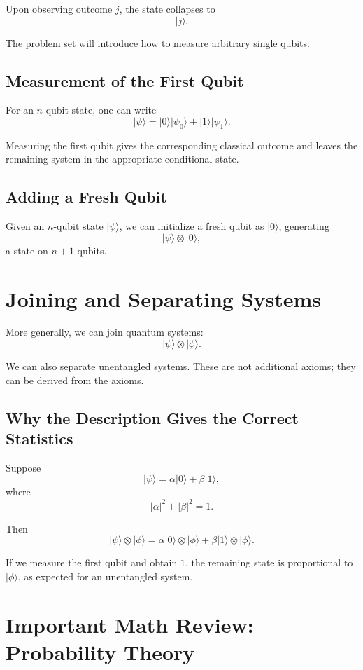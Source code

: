 \documentclass[11pt]{article}
\newcommand{\ket}[1]{\lvert #1\rangle}
\begin{document}
Upon observing outcome $j$, the state collapses to
\[
  \ket{j}.
\]

The problem set will introduce how to measure arbitrary single qubits.

\subsection{Measurement of the First Qubit}

For an $n$-qubit state, one can write
\[
  \ket{\psi}
  =
  \ket{0}\ket{\psi_0}
  +
  \ket{1}\ket{\psi_1}.
\]

Measuring the first qubit gives the corresponding classical outcome and
leaves the remaining system in the appropriate conditional state.

\subsection{Adding a Fresh Qubit}

Given an $n$-qubit state $\ket{\psi}$, we can initialize a fresh qubit as
$\ket{0}$, generating
\[
  \ket{\psi}\otimes\ket{0},
\]
a state on $n+1$ qubits.

\section{Joining and Separating Systems}

More generally, we can join quantum systems:
\[
  \ket{\psi}\otimes\ket{\phi}.
\]

We can also separate unentangled systems. These are not additional axioms;
they can be derived from the axioms.

\subsection{Why the Description Gives the Correct Statistics}

Suppose
\[
  \ket{\psi}
  =
  \alpha\ket{0}+\beta\ket{1},
\]
where
\[
  |\alpha|^2+|\beta|^2=1.
\]

Then
\[
  \ket{\psi}\otimes\ket{\phi}
  =
  \alpha\ket{0}\otimes\ket{\phi}
  +
  \beta\ket{1}\otimes\ket{\phi}.
\]

If we measure the first qubit and obtain $1$, the remaining state is
proportional to $\ket{\phi}$, as expected for an unentangled system.

\section{Important Math Review: Probability Theory}
\end{document}
